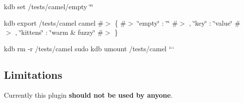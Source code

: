 kdb set /tests/camel/empty \char`\"{}\char`\"{}

kdb export /tests/camel camel \#$>$ \{ \#$>$ \char`\"{}empty\char`\"{} \+: \char`\"{}\char`\"{} \#$>$ , \char`\"{}key\char`\"{} \+: \char`\"{}value\char`\"{} \#$>$ , \char`\"{}kittens\char`\"{} \+: \char`\"{}warm \& fuzzy\char`\"{} \#$>$ \}

kdb rm -\/r /tests/camel sudo kdb umount /tests/camel ```

\subsection*{Limitations}

Currently this plugin {\bfseries should not be used by anyone}. 